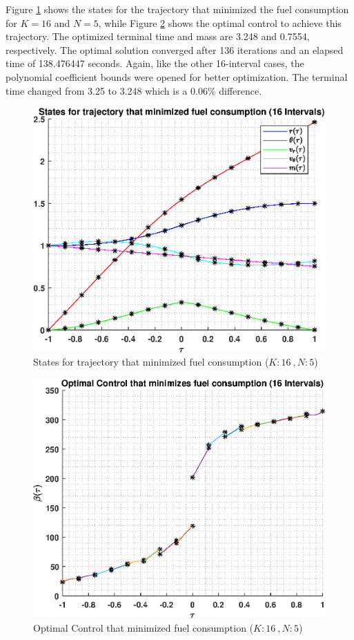 \documentclass[]{article}
\begin{document}
\vspace{2mm}\newline 
Figure \ref{fig:directStatesK16Poly5} shows the states for the trajectory that minimized the fuel consumption for \(K = 16\) and  \(N = 5\), while Figure \ref{fig:directControlK16Poly5} shows the optimal control to achieve this trajectory. The optimized terminal time and mass are 3.248 and 0.7554, respectively. The optimal solution converged after 136 iterations and an elapsed time of 138.476447 seconds. Again, like the other 16-interval cases, the polynomial coefficient bounds were opened for better optimization. The terminal time changed from 3.25 to 3.248 which is a 0.06\% difference. 
\begin{figure}
	\centering
	\includegraphics[scale=0.75]{directStatesK16Poly5.eps}
	\caption{States for trajectory that minimized fuel consumption (\(K:16\ , N:5\))}
	\label{fig:directStatesK16Poly5}
\end{figure}
\begin{figure}
	\centering
	\includegraphics[scale=0.75]{directControlK16Poly5.eps}
	\caption{Optimal Control that minimized fuel consumption (\(K:16\ , N:5\))}
	\label{fig:directControlK16Poly5}
\end{figure}
\end{document}
